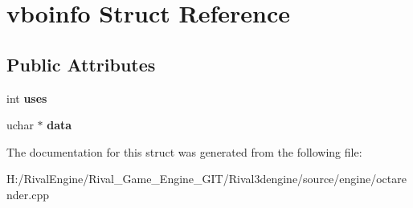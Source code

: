 \hypertarget{structvboinfo}{}\section{vboinfo Struct Reference}
\label{structvboinfo}
\subsection*{Public Attributes}
\begin{DoxyCompactItemize}
\item 
\mbox{\label{structvboinfo_a4d817f857a042ef9e0c2ffc265c3e64f}} 
int {\bfseries uses}
\item 
\mbox{\label{structvboinfo_a887111a8b10370505d97e7c43966e1e3}} 
uchar $\ast$ {\bfseries data}
\end{DoxyCompactItemize}


The documentation for this struct was generated from the following file\+:\begin{DoxyCompactItemize}
\item 
H\+:/\+Rival\+Engine/\+Rival\+\_\+\+Game\+\_\+\+Engine\+\_\+\+G\+I\+T/\+Rival3dengine/source/engine/octarender.\+cpp\end{DoxyCompactItemize}
